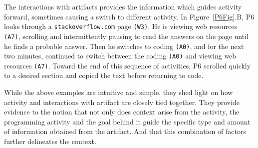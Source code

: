 
The interactions with artifacts provides the information which guides activity forward, sometimes causing a switch to different activity. In Figure~\ref{P6Fig}.B, P6 looks through a \texttt{stackoverflow.com} page \texttt{(W3)}. He is viewing web resources \texttt{(A7)}, scrolling and intermittently pausing to read the answers on the page until he finds a probable answer. Then he switches to coding \texttt{(A0)}, and for the next two minutes, continued to switch between the coding \texttt{(A0)} and viewing web resources \texttt{(A7)}. Toward the end of this sequence of activities, P6 scrolled quickly to a desired section and copied the text before returning to code.


While the above examples are intuitive and simple, they shed light on how activity and interactions with artifact are closely tied together. They provide evidence to the notion that not only does context arise from the activity, the programming activity and the goal behind it guide the specific type and amount of information obtained from the artifact. And that this combination of factors further delineates the context.


